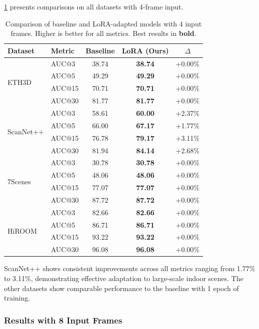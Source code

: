 \cref{tab:results_4frames} presents comparisons on all datasets with 4-frame input.

\begin{table}[t]
\centering
\caption{Comparison of baseline and LoRA-adapted models with 4 input frames. Higher is better for all metrics. Best results in \textbf{bold}.}
\label{tab:results_4frames}
\setlength{\tabcolsep}{4pt}
\begin{tabular}{@{}l l c c c@{}}
\toprule
Dataset & Metric & Baseline & LoRA (Ours) & $\Delta$ \\
\midrule
\multirow{4}{*}{ETH3D}
& AUC@3 & 38.74 & \textbf{38.74} & +0.00\% \\
& AUC@5 & 49.29 & \textbf{49.29} & +0.00\% \\
& AUC@15 & 70.71 & \textbf{70.71} & +0.00\% \\
& AUC@30 & 81.77 & \textbf{81.77} & +0.00\% \\
\midrule
\multirow{4}{*}{ScanNet++}
& AUC@3 & 58.61 & \textbf{60.00} & +2.37\% \\
& AUC@5 & 66.00 & \textbf{67.17} & +1.77\% \\
& AUC@15 & 76.78 & \textbf{79.17} & +3.11\% \\
& AUC@30 & 81.94 & \textbf{84.14} & +2.68\% \\
\midrule
\multirow{4}{*}{7Scenes}
& AUC@3 & 30.78 & \textbf{30.78} & +0.00\% \\
& AUC@5 & 48.06 & \textbf{48.06} & +0.00\% \\
& AUC@15 & 77.07 & \textbf{77.07} & +0.00\% \\
& AUC@30 & 87.72 & \textbf{87.72} & +0.00\% \\
\midrule
\multirow{4}{*}{HiROOM}
& AUC@3 & 82.66 & \textbf{82.66} & +0.00\% \\
& AUC@5 & 86.71 & \textbf{86.71} & +0.00\% \\
& AUC@15 & 93.22 & \textbf{93.22} & +0.00\% \\
& AUC@30 & 96.08 & \textbf{96.08} & +0.00\% \\
\bottomrule
\end{tabular}
\end{table}

ScanNet++ shows consistent improvements across all metrics ranging from 1.77\% to 3.11\%, demonstrating effective adaptation to large-scale indoor scenes. The other datasets show comparable performance to the baseline with 1 epoch of training.

\subsubsection{Results with 8 Input Frames}

